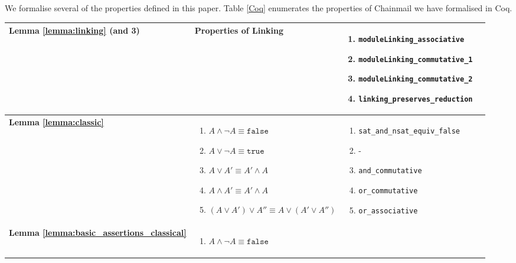 We formalise several of the properties defined in this paper. Table \ref{Coq} enumerates the properties of Chainmail we have formalised in Coq.

\begin{table}
  \begin{tabular}{|l|l|l|l|}
    \hline

\textbf{Lemma \ref{lemma:linking} (and 3)} &
Properties of Linking
        & 
\parbox{.45\textwidth}{\scriptsize\begin{enumerate}[label={(\arabic*)}]
            \item \texttt{moduleLinking\_associative}
            \item \texttt{moduleLinking\_commutative\_1}
            \item \texttt{moduleLinking\_commutative\_2}
            \item \texttt{linking\_preserves\_reduction}
        \end{enumerate}}
        \\
\hline
\textbf{Lemma \ref{lemma:classic}} &   
\parbox{.45\textwidth}{\scriptsize\begin{enumerate}[label={(\arabic*)}]
            \item $A \wedge \neg A \equiv \texttt{false}$
            \item $A \vee \neg A \equiv \texttt{true}$
            \item $A \vee A' \equiv A' \wedge A$
            \item $A \wedge A' \equiv A' \wedge A$
            \item $(A \vee A') \vee A'' \equiv A \vee (A' \vee A'')$
        \end{enumerate}}
        & 
\parbox{.45\textwidth}{\scriptsize\begin{enumerate}[label={(\arabic*)}]
            \item \texttt{sat\_and\_nsat\_equiv\_false}
            \item -
            \item \texttt{and\_commutative}
            \item \texttt{or\_commutative}
            \item \texttt{or\_associative}
        \end{enumerate}}
        \\
\hline
\textbf{Lemma \ref{lemma:basic_assertions_classical}} &   
\parbox{.45\textwidth}{\scriptsize\begin{enumerate}[label={(\arabic*)}]
            \item $A \wedge \neg A \equiv \texttt{false}$

\end{enumerate}}
\end{tabular}
\end{table}
